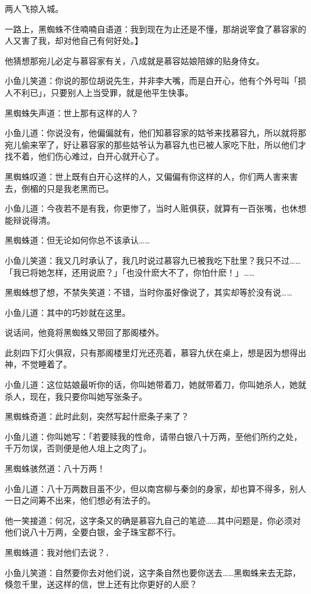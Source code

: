 \documentclass[12pt,oneside]{book}
\begin{document}
两人飞掠入城。

一路上，黑蜘蛛不住喃喃自语道：我到现在为止还是不懂，那胡说宰食了慕容家的人又害了我，却对他自己有何好处。】

他猜想那宛儿必定与慕容家有关，八成就是慕容姑娘陪嫁的贴身侍女。

小鱼儿笑道：你说的那位胡说先生，并非李大嘴，而是白开心，他有个外号叫「损人不利已」，只要别人上当受罪，就是他平生快事。

黑蜘蛛失声道：世上那有这样的人？

小鱼儿道：你说没有，他偏偏就有，他们知慕容家的姑爷来找慕容九，所以就将那宛儿偷来宰了，好让慕容家的那些姑爷认为慕容九也已被人家吃下肚，所以他们才找不着，他们伤心难过，白开心就开心了。

黑蜘蛛叹道：世上既有白开心这样的人，又偏偏有你这样的人，你们两人害来害去，倒楣的只是我老黑而已。

小鱼儿道：今夜若不是有我，你更惨了，当时人赃俱获，就算有一百张嘴，也休想能辩说得清。

黑蜘蛛道：但无论如何你总不该承认\ldots\ldots{}

小鱼儿笑道：我又几时承认了，我几时说过慕容九已被我吃下肚里？我只不过\ldots\ldots「我已将她怎样，还用说麽？」「也没什麽大不了，你怕什麽！」\ldots\ldots{}

黑蜘蛛想了想，不禁失笑道：不错，当时你虽好像说了，其实却等於没有说\ldots\ldots{}

小鱼儿道：其中的巧妙就在这里。

说话间，他竟将黑蜘蛛又带回了那阁楼外。

此刻四下灯火俱寂，只有那阁楼里灯光还亮着，慕容九伏在桌上，想是因为想得出神，不觉睡着了。

小鱼儿道：这位姑娘最听你的话，你叫她带着刀，她就带着刀，你叫她杀人，她就杀人，现在，我只要你叫她写张条子。

黑蜘蛛奇道：此时此刻，突然写起什麽条子来了？

小鱼儿道：你叫她写：「若要赎我的性命，请带白银八十万两，至他们所约之处，千万勿误，否则便是他人俎上之肉了」。

黑蜘蛛骇然道：八十万两！

小鱼儿道：八十万两数目虽不少，但以南宫柳与秦剑的身家，却也算不得多，别人一日之间筹不出来，他们想必有法子的。

他一笑接道：何况，这字条又的确是慕容九自己的笔迹\ldots\ldots 其中问题是，你必须对他们说八十万两，全要白银，金子珠宝郡不行。

黑蜘蛛道：我对他们去说？．

小鱼儿笑道：自然要你去对他们说，这字条自然也要你送去\ldots\ldots 黑蜘蛛来去无踪，倏忽千里，送这样的信，世上还有比你更好的人麽？
\end{document}
